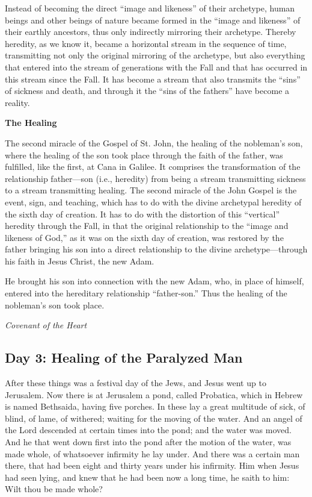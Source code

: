 Instead of becoming the direct “image and likeness” of their archetype, human beings and other beings of nature became
formed in the “image and likeness” of their earthly ancestors, thus only indirectly mirroring their archetype. Thereby
heredity, as we know it, became a horizontal stream in the sequence of time, transmitting not only the original
mirroring of the archetype, but also everything that entered into the stream of generations with the Fall and that has
occurred in this stream since the Fall. It has become a stream that also transmits the “sins” of sickness and death,
and through it the “sins of the fathers” have become a reality.

\textbf{The Healing}

The second miracle of the Gospel of St. John, the healing of the nobleman's son, where the healing
of the son took place through the faith of the father, was fulfilled, like the first, at Cana in Galilee. It comprises
the transformation of the relationship father—son (i.e., heredity) from being a stream
transmitting sickness to a stream transmitting healing. The second miracle of the John Gospel is the event, sign, and
teaching, which has to do with the divine archetypal heredity of the sixth day of creation. It has to do with the
distortion of this “vertical” heredity through the Fall, in that the original relationship to the “image and likeness
of God,” as it was on the sixth day of creation, was restored by the father bringing his son into a direct relationship
to the divine archetype—through his faith in Jesus Christ, the new Adam.

\begin{quotationx}
He brought his son into connection with the new Adam, who, in place of himself, entered into the hereditary relationship
“father-son.” Thus the healing of the nobleman's son took place. \begin{flushright} \emph{Covenant of the Heart}\end{flushright}

\end{quotationx}
\subsection*{Day 3: Healing of the Paralyzed Man}
After these things was a festival day of the Jews, and Jesus went up to Jerusalem. Now there is at Jerusalem a pond,
called Probatica, which in Hebrew is named Bethsaida, having five porches. In these lay a great multitude of sick, of
blind, of lame, of withered; waiting for the moving of the water. And an angel of the Lord descended at certain times
into the pond; and the water was moved. And he that went down first into the pond after the motion of the water, was
made whole, of whatsoever infirmity he lay under. And there was a certain man there, that had been eight and thirty
years under his infirmity. Him when Jesus had seen lying, and knew that he had been now a long time, he saith to him:
Wilt thou be made whole?

